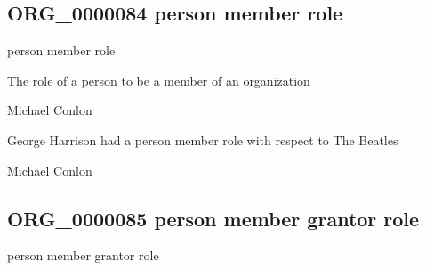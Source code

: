 \documentclass[letterpaper,10pt,english]{sphinxmanual}
\begin{document}
\subsection{ORG\_0000084 \sphinxhyphen{} person member role}
\label{\detokenize{doc-ORG_0000084:org-0000084-person-member-role}}\label{\detokenize{doc-ORG_0000084:index-0}}\label{\detokenize{doc-ORG_0000084::doc}}
\begin{sphinxShadowBox}

\sphinxAtStartPar
person member role
\end{sphinxShadowBox}

\begin{sphinxShadowBox}

\sphinxAtStartPar
The role of a person to be a member of an organization
\end{sphinxShadowBox}

\begin{sphinxShadowBox}

\sphinxAtStartPar
Michael Conlon 
\end{sphinxShadowBox}

\begin{sphinxShadowBox}

\sphinxAtStartPar
George Harrison had a person member role with respect to The Beatles
\end{sphinxShadowBox}

\begin{sphinxShadowBox}

\sphinxAtStartPar
Michael Conlon 
\end{sphinxShadowBox}
\begin{quote}

\ignorespaces \end{quote}


\subsection{ORG\_0000085 \sphinxhyphen{} person member grantor role}
\label{\detokenize{doc-ORG_0000085:org-0000085-person-member-grantor-role}}\label{\detokenize{doc-ORG_0000085:index-0}}\label{\detokenize{doc-ORG_0000085::doc}}
\begin{sphinxShadowBox}

\sphinxAtStartPar
person member grantor role
\end{sphinxShadowBox}
\end{document}
